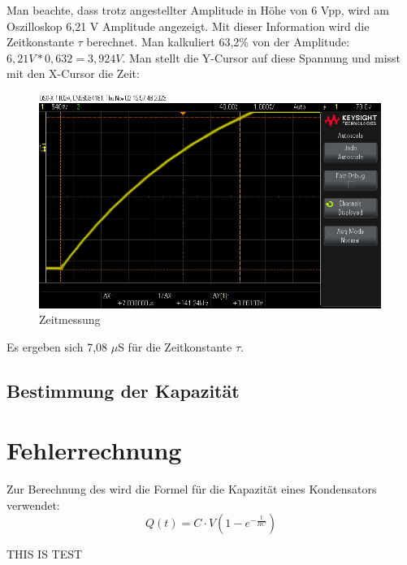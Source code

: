 Man beachte, dass trotz angestellter Amplitude in Höhe von
6 Vpp, wird am Oszilloskop 6,21 V Amplitude angezeigt. Mit dieser 
Information wird die Zeitkonstante $\tau$ berechnet. Man kalkuliert
63,2\% von der Amplitude: $6,21V * 0,632 = 3,924V$. Man stellt die 
Y-Cursor auf diese Spannung und misst mit den X-Cursor die Zeit:
\begin{figure}[H]
	\centering
	\includegraphics[height=7cm]{images/Versuch1/Zeitmessung.png} 
	\caption{Zeitmessung}
	\label{fig: Zeitmessung}
\end{figure}

Es ergeben sich 7,08 $\mu$S für die Zeitkonstante $\tau$. 

\subsection{Bestimmung der Kapazität}



\section{Fehlerrechnung}


Zur Berechnung des wird die Formel für die Kapazität eines Kondensators verwendet:
\begin{equation}
    Q(t) = C \cdot V \left(1 - e^{-\frac{t}{RC}}\right)
\end{equation}


THIS IS TEST
